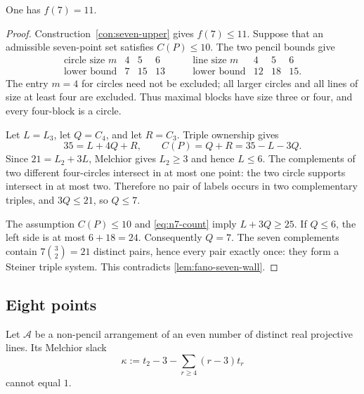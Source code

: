 \begin{proposition}\label{prop:n7}
One has $f(7)=11$.
\end{proposition}

\begin{proof}
Construction~\ref{con:seven-upper} gives $f(7)\leq11$.  Suppose that an
admissible seven-point set satisfies $C(P)\leq10$.  The two pencil bounds
give
\[
 \begin{array}{c|ccc}
 \text{circle size }m&4&5&6\\ \hline
 \text{lower bound}&7&15&13
 \end{array}
 \qquad
 \begin{array}{c|ccc}
 \text{line size }m&4&5&6\\ \hline
 \text{lower bound}&12&18&15.
 \end{array}
\]
The entry $m=4$ for circles need not be excluded; all larger circles and
all lines of size at least four are excluded.  Thus maximal blocks have size
three or four, and every four-block is a circle.

Let $L=L_3$, let $Q=C_4$, and let $R=C_3$.  Triple ownership gives
\begin{equation}\label{eq:n7-count}
 35=L+4Q+R,\qquad C(P)=Q+R=35-L-3Q.
\end{equation}
Since $21=L_2+3L$, Melchior gives $L_2\geq3$ and hence $L\leq6$.
The complements of two different four-circles intersect in at most one
point: the two circle supports intersect in at most two.  Therefore no pair
of labels occurs in two complementary triples, and $3Q\leq21$, so $Q\leq7$.

The assumption $C(P)\leq10$ and \eqref{eq:n7-count} imply
$L+3Q\geq25$.  If $Q\leq6$, the left side is at most $6+18=24$.
Consequently $Q=7$.  The seven complements contain
$7\binom32=21$ distinct pairs, hence every pair exactly once: they form a
Steiner triple system.  This contradicts \cref{lem:fano-seven-wall}.
\end{proof}

\subsection{Eight points}

\begin{lemma}\label{lem:even-arrangement-slack}
Let $\mathcal A$ be a non-pencil arrangement of an even number of distinct
real projective lines.  Its Melchior slack
\[
 \kappa:=t_2-3-\sum_{r\geq4}(r-3)t_r
\]
cannot equal $1$.
\end{lemma}

